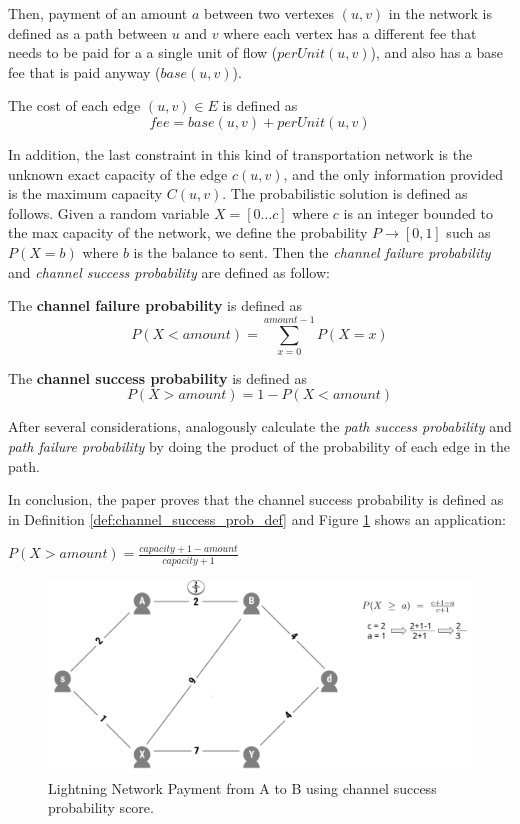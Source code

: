 Then, payment of an amount $a$ between two vertexes $(u, v)$ in the network is defined 
as a path between $u$ and $v$ where each vertex has a different fee that needs to be paid for a 
a single unit of flow ($perUnit(u, v)$), and also has a base fee that is paid anyway ($base(u, v)$).

\begin{definition}
    The cost of each edge $(u, v) \in E$ is defined as 
    $$fee = base(u, v) + perUnit(u, v)$$
\end{definition}

In addition, the last constraint in this kind of transportation network is the 
unknown exact capacity of the edge $c(u, v)$, and the only information provided 
is the maximum capacity $C(u, v)$.
The probabilistic solution is defined as follows.  Given  a random variable $X = [0 \dots c]$ where $c$ is an integer bounded to the max capacity of the network, we define the probability 
$P \rightarrow [0, 1]$ such as $P(X = b)$ where $b$ is the balance to sent.
Then the \emph{channel failure probability} and \emph{channel success probability} are defined as follow:

\begin{definition}
   The {\bf channel failure probability} is defined as $$P(X < amount) = \sum_{x = 0}^{amount - 1} P(X = x)$$ 
\end{definition}

\begin{definition}
    The {\bf channel success probability} is defined as $$P(X > amount) = 1 -  P(X < amount)$$
\end{definition}

After several considerations, analogously calculate the \emph{path success probability} and
\emph{path failure probability} by doing the product of the probability of each edge in the path.

In conclusion, the paper proves that the channel success probability is defined as in 
Definition \ref{def:channel_success_prob_def} and  Figure \ref{fig:channel_success_prob_score}
shows an application: 

\begin{definition}
\label{def:channel_success_prob_def}
    $P(X > amount) = \frac{capacity + 1 - amount}{capacity + 1}$
\end{definition}


\begin{figure}[h]
  \begin{center}
  \includegraphics[width=0.6\columnwidth]{imgs/mincost_rene1.png}
  \end{center}
  \caption{Lightning Network Payment from A to B using channel success probability score.} 
  \label{fig:channel_success_prob_score}
\end{figure}


